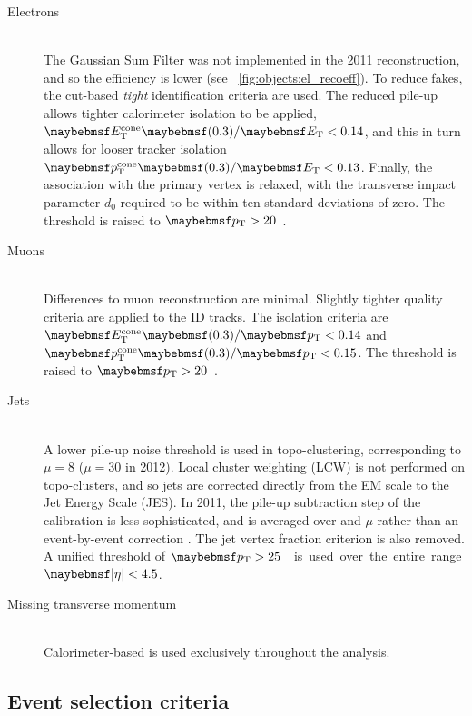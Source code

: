 \begin{description}
\item[Electrons] \hfill \\
	The Gaussian Sum Filter was not implemented in the 2011 reconstruction, and so the 
	efficiency is lower (see \Figure~\ref{fig:objects:el_recoeff}). To reduce fakes, the 
	cut-based \textit{tight} identification criteria are used. The reduced pile-up allows
	tighter calorimeter isolation to be applied, $\etcone{0.3}/\et < 0.14$, and this in 
	turn allows for looser tracker isolation $\ptcone{0.3}/\et < 0.13$. Finally, the 
	association with the primary vertex is relaxed, with the transverse impact parameter 
	$d_0$ required to be within ten standard deviations of zero. The threshold is raised 
	to \unit{$\pt > 20$}{\GeV}.

\item[Muons] \hfill \\
	Differences to muon reconstruction are minimal. Slightly tighter quality criteria are 
	applied to the ID tracks. The isolation criteria are $\etcone{0.3}/\pt < 0.14$ and 
	$\ptcone{0.3}/\pt < 0.15$. The threshold is raised to \unit{$\pt > 20$}{\GeV}.

\item[Jets] \hfill \\
	A lower pile-up noise threshold is used in topo-clustering, corresponding to 
	$\mu = 8$ (\cf $\mu = 30$ in 2012). Local cluster weighting (LCW) is not performed on 
	topo-clusters, and so jets are corrected directly from the EM scale to the Jet Energy 
	Scale (JES). In 2011, the pile-up subtraction step of the calibration is less 
	sophisticated, and is averaged over \npv and $\mu$ rather than an event-by-event 
	correction \cite{Jets:PileupCorrection:2011}. The jet vertex fraction criterion is also 
	removed. A unified threshold of \unit{$\pt > 25$}{\GeV} is used over the entire 
	range $\mods{\eta} < 4.5$.

\item[Missing transverse momentum] \hfill \\
	Calorimeter-based \met is used exclusively throughout the analysis.

\end{description}



\subsection{Event selection criteria}

